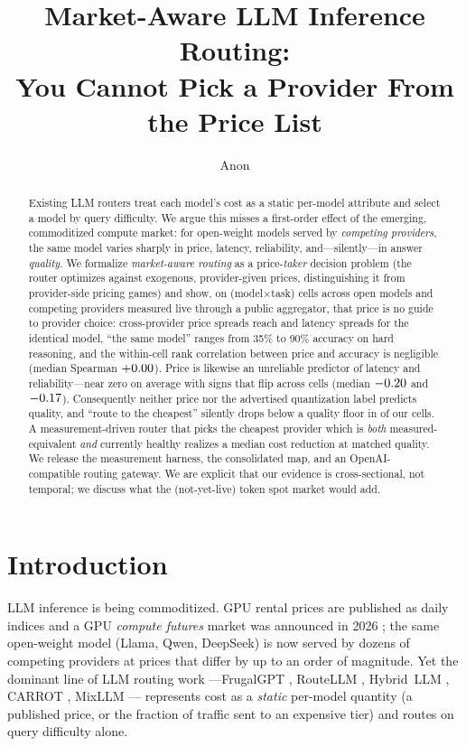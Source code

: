\documentclass{article}
\title{Market-Aware LLM Inference Routing:\\ You Cannot Pick a Provider From the Price List}
\author{Anon}
\begin{document}
\maketitle

\begin{abstract}
Existing LLM routers treat each model's cost as a static per-model attribute and select a
model by query difficulty. We argue this misses a first-order effect of the emerging,
commoditized compute market: for open-weight models served by \emph{competing providers},
the same model varies sharply in price, latency, reliability, and---silently---in answer
\emph{quality}. We formalize \emph{market-aware routing} as a price-\emph{taker} decision
problem (the router optimizes against exogenous, provider-given prices, distinguishing it
from provider-side pricing games) and show, on \numcells{} (model$\times$task) cells across
\nummodels{} open models and competing providers measured live through a public aggregator,
that price is no guide to provider choice: cross-provider price spreads reach \maxpricex{} and
latency spreads \maxlatx{} for the identical model, ``the same model'' ranges from 35\% to 90\%
accuracy on hard reasoning, and the within-cell rank correlation between price and accuracy is
negligible (median Spearman $+0.00$). Price is likewise an unreliable predictor of latency
and reliability---near zero on average with signs that flip across cells (median
$-0.20$ and $-0.17$). Consequently neither price nor the advertised quantization label
predicts quality, and ``route to the cheapest'' silently drops below a quality floor in
\numtraps{} of our cells. A measurement-driven router that picks the cheapest provider which is
\emph{both} measured-equivalent \emph{and} currently healthy realizes a median \medsave{} cost
reduction at matched quality. We release the measurement harness, the consolidated map, and an
OpenAI-compatible routing gateway. We are explicit that our evidence is cross-sectional, not
temporal; we discuss what the (not-yet-live) token spot market would add.
\end{abstract}

\section{Introduction}
LLM inference is being commoditized. GPU rental prices are published as daily indices and a
GPU \emph{compute futures} market was announced in 2026 \citep{cme2026compute}; the same
open-weight model (Llama, Qwen, DeepSeek) is now served by dozens of competing providers at
prices that differ by up to an order of magnitude. Yet the dominant line of LLM routing work
---FrugalGPT \citep{chen2023frugalgpt}, RouteLLM \citep{ong2024routellm}, Hybrid~LLM
\citep{ding2024hybrid}, CARROT \citep{somerstep2025carrot}, MixLLM \citep{wang2025mixllm}---
represents cost as a \emph{static} per-model quantity (a published price, or the fraction of
traffic sent to an expensive tier) and routes on query difficulty alone.
\end{document}
